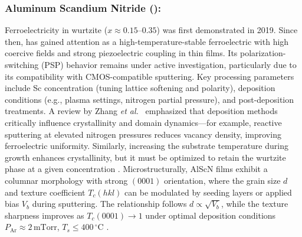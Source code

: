 \documentclass[a4paper,fleqn]{cas-sc}
\begin{document}
\subsubsection*{Aluminum Scandium Nitride ():} Ferroelectricity in wurtzite  ($x \approx 0.15\text{--}0.35$) was first demonstrated in 2019. Since then,  has gained attention as a high-temperature-stable ferroelectric with high coercive fields and strong piezoelectric coupling in thin films. Its polarization-switching (PSP) behavior remains under active investigation, particularly due to its compatibility with CMOS-compatible sputtering. Key processing parameters include Sc concentration (tuning lattice softening and polarity), deposition conditions (e.g., plasma settings, nitrogen partial pressure), and post-deposition treatments. A review by Zhang \textit{et al.}~\cite{zhang2024new} emphasized that deposition methods critically influence crystallinity and domain dynamics---for example, reactive sputtering at elevated nitrogen pressures reduces vacancy density, improving ferroelectric uniformity. Similarly, increasing the substrate temperature during growth enhances crystallinity, but it must be optimized to retain the wurtzite phase at a given  concentration \cite{yasuoka2021impact}. Microstructurally, AlScN films exhibit a columnar morphology with strong \((0001)\) orientation, where the grain size \(d\) and texture coefficient \(T_c(hkl)\) can be modulated by seeding layers or applied bias \(V_b\) during sputtering. The relationship follows \(d \propto \sqrt{V_b}\), while the texture sharpness improves as \(T_c(0001) \rightarrow 1\) under optimal deposition conditions \(P_{\text{Ar}} \approx 2\,\text{mTorr}\), \(T_s \leq 400\,^\circ\text{C}\) \cite{patidar2024deposition,zhang2024new}.
\end{document}
